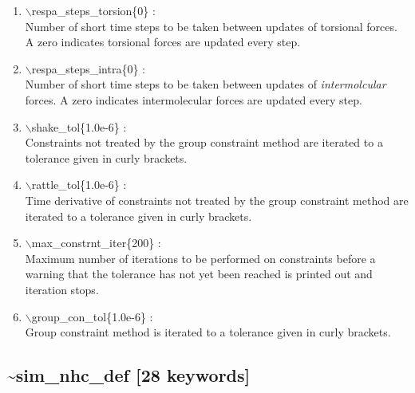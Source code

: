 \documentclass[12pt,titlepage]{article}
\begin{document}
\begin{enumerate}
 \vspace{0.15in} 
 \item   $\backslash$respa\_steps\_torsion\{0\} : \\
    Number of short time steps to be taken between updates of torsional
    forces.  A zero indicates torsional forces are updated every step.

 \vspace{0.15in} 
  \item   $\backslash$respa\_steps\_intra\{0\} : \\
    Number of short time steps to be taken between updates of 
    {\it intermolcular} forces.  A zero indicates intermolecular forces are 
    updated every step.

 \vspace{0.15in} 
 \item   $\backslash$shake\_tol\{1.0e-6\} : \\
     Constraints not treated by the group constraint method are iterated to a
     tolerance given in curly brackets.


 \vspace{0.15in} 
 \item   $\backslash$rattle\_tol\{1.0e-6\} : \\
      Time derivative of constraints not treated by the group constraint 
      method are iterated to a tolerance given in curly brackets.


 \vspace{0.15in} 
 \item   $\backslash$max\_constrnt\_iter\{200\} : \\
     Maximum number of iterations to be performed on constraints before a 
     warning that the tolerance has not yet been reached is printed out and 
     iteration stops.

 \vspace{0.15in} 
 \item   $\backslash$group\_con\_tol\{1.0e-6\} : \\
     Group constraint method is iterated to a tolerance given in curly 
     brackets.

\end{enumerate}

\newpage
\subsection*{\bf \~{}sim\_nhc\_def [28 keywords]}
\end{document}
